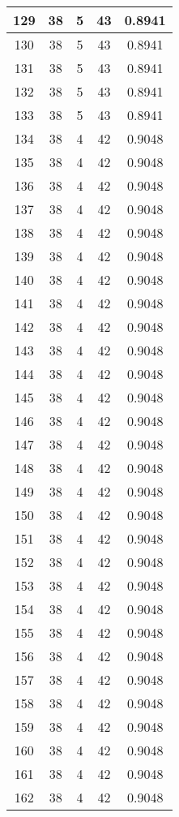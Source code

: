 \documentclass[letterpaper, 12pt]{article}
\begin{document}
\begin{longtable}{|c|c|c|c|c|}
\hline
129 & 38 & 5 & 43 & 0.8941 \\
\hline
130 & 38 & 5 & 43 & 0.8941 \\
\hline
131 & 38 & 5 & 43 & 0.8941 \\
\hline
132 & 38 & 5 & 43 & 0.8941 \\
\hline
133 & 38 & 5 & 43 & 0.8941 \\
\hline
134 & 38 & 4 & 42 & 0.9048 \\
\hline
135 & 38 & 4 & 42 & 0.9048 \\
\hline
136 & 38 & 4 & 42 & 0.9048 \\
\hline
137 & 38 & 4 & 42 & 0.9048 \\
\hline
138 & 38 & 4 & 42 & 0.9048 \\
\hline
139 & 38 & 4 & 42 & 0.9048 \\
\hline
140 & 38 & 4 & 42 & 0.9048 \\
\hline
141 & 38 & 4 & 42 & 0.9048 \\
\hline
142 & 38 & 4 & 42 & 0.9048 \\
\hline
143 & 38 & 4 & 42 & 0.9048 \\
\hline
144 & 38 & 4 & 42 & 0.9048 \\
\hline
145 & 38 & 4 & 42 & 0.9048 \\
\hline
146 & 38 & 4 & 42 & 0.9048 \\
\hline
147 & 38 & 4 & 42 & 0.9048 \\
\hline
148 & 38 & 4 & 42 & 0.9048 \\
\hline
149 & 38 & 4 & 42 & 0.9048 \\
\hline
150 & 38 & 4 & 42 & 0.9048 \\
\hline
151 & 38 & 4 & 42 & 0.9048 \\
\hline
152 & 38 & 4 & 42 & 0.9048 \\
\hline
153 & 38 & 4 & 42 & 0.9048 \\
\hline
154 & 38 & 4 & 42 & 0.9048 \\
\hline
155 & 38 & 4 & 42 & 0.9048 \\
\hline
156 & 38 & 4 & 42 & 0.9048 \\
\hline
157 & 38 & 4 & 42 & 0.9048 \\
\hline
158 & 38 & 4 & 42 & 0.9048 \\
\hline
159 & 38 & 4 & 42 & 0.9048 \\
\hline
160 & 38 & 4 & 42 & 0.9048 \\
\hline
161 & 38 & 4 & 42 & 0.9048 \\
\hline
162 & 38 & 4 & 42 & 0.9048 \\

\end{longtable}
\end{document}

